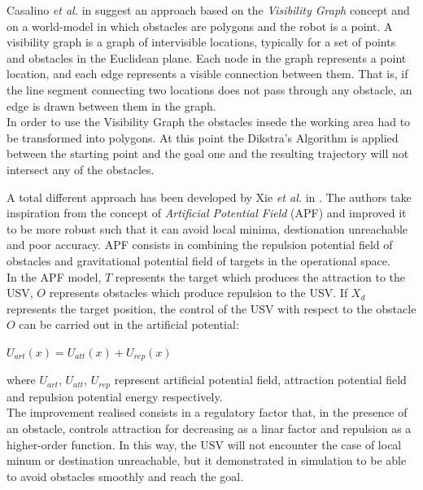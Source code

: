 \documentclass[12pt]{article}
\begin{document}
              \indent Casalino \textit{et al.} in \parencite{Casalino2009} suggest an approach based on the \textit{Visibility Graph} concept and on a world-model in which obstacles are polygons and the robot is a point. A visibility graph is a graph of intervisible locations, typically for a set of points and obstacles in the Euclidean plane. Each node in the graph represents a point location, and each edge represents a visible connection between them. That is, if the line segment connecting two locations does not pass through any obstacle, an edge is drawn between them in the graph.\\
              In order to use the Visibility Graph the obstacles insede the working area had to be transformed into polygons. At this point the Dikstra's Algorithm is applied between the starting point and the goal one and the resulting trajectory will not intersect any of the obstacles.

              A total different approach has been developed by Xie \textit{et al.} in \parencite{Xie2014}. The authors take inspiration from the concept of \textit{Artificial Potential Field} (APF) \parencite{Khatib1985} and improved it to be more robust such that it can avoid local minima, destionation unreachable and poor accuracy. APF consists in combining the repulsion potential field of obstacles and gravitational potential field of targets in the operational space.\\
              In the APF model, $T$ represents the target which produces the attraction to the USV, $O$ represents obstacles which produce repulsion to the USV. If $X_d$ represents the target position, the control of the USV with respect to the obstacle $O$ can be carried out in the artificial potential:
                  \begin{center}
                         $U_{art}(x) = U_{att}(x) + U_{rep}(x)$
                  \end{center}
              where $U_{art}$, $U_{att}$, $U_{rep}$ represent artificial potential field, attraction potential field and repulsion potential energy respectively.\\
              The improvement realised consists in a regulatory factor that, in the presence of an obstacle, controls attraction for decreasing as a linar factor and repulsion as a higher-order function. In this way, the USV will not encounter the case of local minum or destination unreachable, but it demonstrated in simulation to be able to avoid obstacles smoothly and reach the goal.
\end{document}
